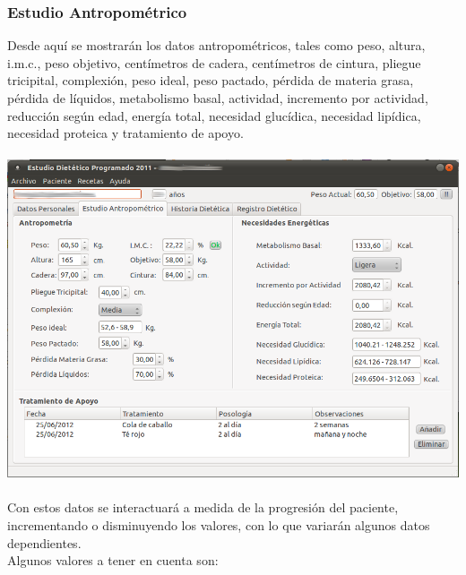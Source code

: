 \documentclass[12pt, spanish]{article}
\begin{document}
\subsubsection{Estudio Antropométrico}
Desde aquí se mostrarán los datos antropométricos, tales como peso, altura, i.m.c., peso objetivo, centímetros de cadera, centímetros de cintura, pliegue tricipital, complexión, peso ideal, peso pactado, pérdida de materia grasa, pérdida de líquidos, metabolismo basal, actividad, incremento por actividad, reducción según edad, energía total, necesidad glucídica, necesidad lipídica, necesidad proteica y tratamiento de apoyo.\\\\
\includegraphics[scale=0.5]{Image/paciente-antrop.png}\\\\
Con estos datos se interactuará a medida de la progresión del paciente, incrementando o disminuyendo los valores, con lo que variarán algunos datos dependientes.\\
Algunos valores a tener en cuenta son:
\end{document}
